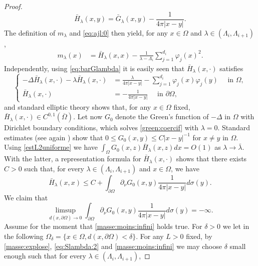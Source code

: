 \documentclass[10pt]{amsart}
\numberwithin{equation}{section}
\newcommand{\vp}{\varphi}
\newcommand{\Om}{\Omega}
\theoremstyle{plain}
\theoremstyle{remark}
\begin{document}
\begin{proof}
$$\bar{H}_\lambda(x,y) = \bar{G}_\lambda(x,y) - \frac{1}{4 \pi |x-y|}.$$ The definition of $m_\lambda$ and \eqref{eq:ajl:0} then yield, for any $x \in \Om$ and $\lambda \in (\Lambda_i, \Lambda_{i+1})$,
\begin{equation} \label{masse:explose}
\begin{aligned}
 m_\lambda(x) & = \bar{H}_\lambda(x,x)  - \frac{1}{\lambda-\Lambda_i}  \sum_{j=1}^{d_i} \vp_j(x)^2. 
  \end{aligned} 
  \end{equation}
Independently, using \eqref{eq:barGlambda} it is easily seen that $\bar{H}_\lambda(x, \cdot)$ satisfies 
\begin{equation} \label{eq:Slambda}
\left \{\begin{aligned}
- \Delta \bar{H}_\lambda(x, \cdot) - \lambda \bar{H}_\lambda(x, \cdot) &=  \frac{\lambda}{4\pi |x-y|} -  \sum_{j=1}^{d_i} \vp_j(x) \vp_j(y)  \quad \text{ in } \Om, \\
  \bar{H}_\lambda(x, \cdot) & = - \frac{1}{4\pi |x-y|} \quad \text{ in } \partial \Om,
\end{aligned} \right.
\end{equation}
and standard elliptic theory shows that, for any $x \in \Om$ fixed,  $\bar{H}_\lambda(x, \cdot) \in C^{0,1}(\overline{\Om})$. Let now $G_0$ denote the Green's function of $- \Delta$ in $\Om$ with Dirichlet boundary conditions, which solves  \eqref{green:coercif} with $\lambda = 0$. Standard estimates (see again \cite{RobDirichlet}) show that $0 \le G_0(x,y) \le C|x-y|^{-1}$ for $x\neq y$ in $\Om$. Using \eqref{estL2uniforme} we have $\int_{\Om} G_0(x,z) \bar{H}_\lambda(x,z) dx = O(1)$ as $\lambda \to \bar{\lambda}$. With the latter, a representation formula for $\bar{H}_\lambda(x, \cdot)$ shows that there exists $C >0$ such that, for every $\lambda \in (\Lambda_i, \Lambda_{i+1})$ and $x\in \Om$, we have 
\begin{equation} \label{eq:Slambda:2}
 \bar{H}_\lambda(x, x) \le C + \int_{\partial \Om} \partial_\nu G_0(x,y) \frac{1}{4 \pi |x-y|} d \sigma(y). 
\end{equation}
We claim that 
\begin{equation} \label{masse:moins:infini}
\limsup_{d(x, \partial \Om) \to 0} \int_{\partial \Om} \partial_\nu G_0(x,y) \frac{1}{4 \pi |x-y|} d \sigma(y)= - \infty.
\end{equation}
Assume for the moment that \eqref{masse:moins:infini} holds true. For $\delta >0$ we let in the following $\Omega_\delta = \{ x \in \Om, d(x, \partial \Om) < \delta \}$. For any $L > 0$ fixed, by \eqref{masse:explose}, \eqref{eq:Slambda:2} and \eqref{masse:moins:infini} we may choose $\delta$ small enough such that for every $\lambda \in (\Lambda_i, \Lambda_{i+1})$,

\end{proof}
\end{document}
